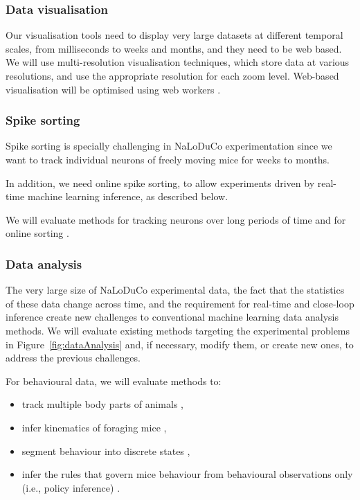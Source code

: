 \subsubsection{Data visualisation}

Our visualisation tools
need to display very large datasets at different temporal scales, from
milliseconds to weeks and months, and they need to be web based.
%
We will use multi-resolution visualisation techniques, which store data at
various resolutions, and use the appropriate resolution for each zoom level.
%
Web-based visualisation will be optimised using web workers
\citep{webWorkers}.

\subsubsection{Spike sorting}

Spike sorting is specially challenging in NaLoDuCo experimentation since we
want to track individual neurons of freely moving mice for weeks to months.

In addition, we need online spike sorting, to allow experiments driven
by real-time machine learning inference, as described below.

We will evaluate methods for tracking neurons over long periods of time
\citep[e.g.,][]{yuanEtAl24,vanBeestEtAl24} and for online sorting
\citep[e.g.,][]{rutishauserEtAl06,santhanamEtAl04}.

\subsubsection{Data analysis}

The very large size of NaLoDuCo experimental data, the fact that the statistics
of these data change across time, and the requirement for real-time and
close-loop inference create new challenges to conventional machine learning
data analysis methods.
%
We will evaluate existing methods targeting the experimental problems
in Figure~\ref{fig:dataAnalysis} and, if necessary, modify them, or create new
ones, to address the previous challenges.

For behavioural data, we will evaluate methods to:

\begin{itemize}

    \item track multiple body parts of
animals \citep[e.g.,][and a switching-linear-dynamical method using RFIDs that
we will develop]{mathisEtAl18,pereiraEtAl22,bidermanEtAl24},

    \item infer kinematics of foraging mice \citep[e.g.,][]{ldspython,challaEtAl11},

    \item segment behaviour into discrete states \citep[e.g.,][and a hierarchical HMM
that we will develop]{wiltschkoEtAl15,hsuAndYttri21},

    \item infer the rules that govern mice behaviour from behavioural observations
only (i.e., policy inference) \citep[e.g.,][]{ziebartEtAl08,zhuEtAl23}.

\end{itemize}

